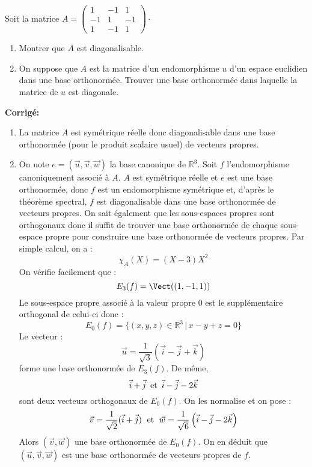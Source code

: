 \documentclass[a4paper,twoside,french,11pt]{VcCours}
\newcommand{\corr}{\textbf{Corrigé:}}
\begin{document}
\begin{Exercice}{} Soit la matrice $A=\begin{pmatrix}
1 & -1 & 1 \\ 
-1 & 1 & -1 \\ 
1 & -1 & 1
\end{pmatrix} \cdot$
\begin{enumerate}
\item Montrer que $A$ est diagonalisable.
\item On suppose que $A$ est la matrice d'un endomorphisme $u$ d'un espace euclidien dans une base orthonormée. Trouver une base orthonormée dans laquelle la matrice de $u$ est diagonale.
\end{enumerate}
\end{Exercice}

\corr 

\begin{enumerate}
\item La matrice $A$ est symétrique réelle donc diagonalisable dans une base orthonormée (pour le produit scalaire usuel) de vecteurs propres.
\item On note $e=\left( \vec{u},\vec{v},\vec{w}\right) $ la base canonique de $\mathbb{R}^3$. Soit $f$ l'endomorphisme canoniquement associé à $A$. $A$ est symétrique réelle et $e$ est une base orthonormée, donc $f$ est un endomorphisme symétrique et, d'après le théorème spectral,  $f$ est diagonalisable dans une base orthonormée de vecteurs propres. On sait également que les sous-espaces propres sont orthogonaux donc il suffit de trouver une base orthonormée de chaque sous-espace propre pour construire une base orthonormée de vecteurs propres. Par simple calcul, on a :
$$ \chi_A(X) = (X-3)X^2$$
On vérifie facilement que :
$$E_3 (f) = \Vect ((1, - 1,1))$$
Le sous-espace propre associé à la valeur propre $0$ est le supplémentaire orthogonal de celui-ci donc :
$$E_0 (f) = \lbrace (x,y,z) \in \mathbb{R}^3 \, \vert \, x - y + z = 0\rbrace$$
Le vecteur :
$$\vec{u} = \dfrac{1}{{\sqrt 3 }}(\vec{i} - \vec{j} + \vec{k})$$
forme une base orthonormée de $E_3 (f)$. De même,
$$\vec i+\vec j  \, \hbox{ et } \, \vec i-\vec j-2\vec k$$
 sont deux vecteurs orthogonaux de $E_0(f)$. On les normalise et on pose :
$$\vec{v} = \dfrac{1}{{\sqrt 2 }}(\vec{i} + \vec{j}) \; \hbox{ et } \; \vec{w} = \dfrac{1}{{\sqrt 6 }}\left( {\vec{i} - \vec{j} - 2\vec{k}} \right) $$
Alors $\left( \vec{v} ,\vec{w} \right) $ une base orthonormée de $E_0(f)$. On en déduit que $\left( \vec{u},\vec{v},\vec{w}\right) $ est une base orthonormée de vecteurs propres de $f$.
\end{enumerate}
\end{document}
